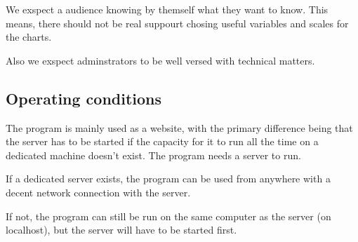 %   
%   


We exspect a audience knowing by themself what they want to know. This means,
there should not be real suppourt chosing useful variables and scales for
the charts. 

Also we exspect adminstrators to be well versed with technical matters.

% 
 

\subsection{Operating conditions}

The program is mainly used as a website, with the primary difference being
 that the server has to be started if the capacity for it to run 
 all the time on a dedicated machine doesn't exist. 
The program needs a server to run. 

If a dedicated server exists, the program can be used from anywhere
 with a decent network connection with the server.

If not, the program can still be run on the same computer as 
the server (on localhost), but the server will have to be started first.
 

